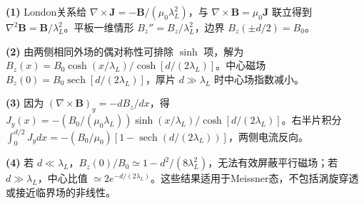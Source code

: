 \par\noindent\textbf{(1)} London关系给 \(\nabla\times\boldsymbol J=-\boldsymbol B/(\mu_0\lambda_L^2)\)，与 \(\nabla\times\boldsymbol B=\mu_0\boldsymbol J\) 联立得到 \(\nabla^2\boldsymbol B=\boldsymbol B/\lambda_L^2\)。平板一维情形 \(B_z''=B_z/\lambda_L^2\)，边界 \(B_z(\pm d/2)=B_0\)。
\par\noindent\textbf{(2)} 由两侧相同外场的偶对称性可排除 \(\sinh\) 项，解为 \(B_z(x)=B_0\cosh(x/\lambda_L)/\cosh[d/(2\lambda_L)]\)。中心磁场 \(B_z(0)=B_0\operatorname{sech}[d/(2\lambda_L)]\)，厚片 \(d\gg\lambda_L\) 时中心场指数减小。
\par\noindent\textbf{(3)} 因为 \((\nabla\times\boldsymbol B)_y=-dB_z/dx\)，得 \(J_y(x)=-(B_0/(\mu_0\lambda_L))\sinh(x/\lambda_L)/\cosh[d/(2\lambda_L)]\)。右半片积分 \(\int_0^{d/2}J_y dx=-(B_0/\mu_0)[1-\operatorname{sech}(d/(2\lambda_L))]\)，两侧电流反向。
\par\noindent\textbf{(4)} 若 \(d\ll\lambda_L\)，\(B_z(0)/B_0\simeq1-d^2/(8\lambda_L^2)\)，无法有效屏蔽平行磁场；若 \(d\gg\lambda_L\)，中心比值 \(\simeq2e^{-d/(2\lambda_L)}\)。这些结果适用于Meissner态，不包括涡旋穿透或接近临界场的非线性。
